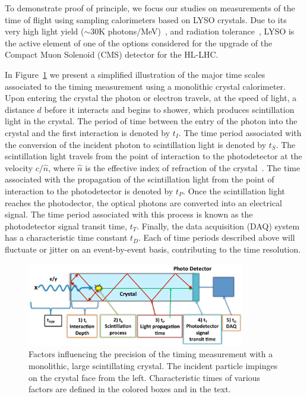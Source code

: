 \documentclass[12pt]{article}
\begin{document}
To demonstrate proof of principle, we focus our studies on
measurements of the time of flight using sampling calorimeters
based on LYSO crystals. Due to its very high light
yield ($\sim 30$K photons/MeV)~\cite{LYSOProperties},  and 
radiation tolerance~\cite{5402126, 4291695, 5402125, Dissertori:2013rma},
LYSO is the active element of one of the options considered 
for the upgrade of the Compact Muon Solenoid (CMS) detector
for the HL-LHC. 

In Figure~\ref{fig:ScintillatorTiming} we present a simplified illustration 
of the major time scales associated to the timing measurement using a 
monolithic crystal calorimeter.  Upon entering the crystal the photon or electron travels, 
at the speed of light, a distance $d$ before it interacts and begins to shower, 
which produces scintillation light in the crystal. The period of time between the 
entry of the photon into the crystal and the first interaction is denoted by $t_I$. 
The time period associated with the conversion of the incident photon to 
scintillation light is denoted by $t_S$. The scintillation light travels from 
the point of interaction to the photodetector at the velocity $c/\hat{n}$, where $\hat{n}$ 
is the effective index of refraction of the crystal~\cite{Moses}. The time associated 
with the propagation of the scintillation light from the point of interaction 
to the photodetector is denoted by $t_P$. Once the scintillation light reaches the 
photodector, the optical photons are converted into an electrical signal. The time period 
associated with this process is known as the photodetector signal transit time, $t_T$.  
Finally, the data acquisition (DAQ) system has a characteristic time constant $t_D$. 
Each of time periods described above will fluctuate or jitter on an event-by-event basis, 
contributing to the time resolution.


\begin{figure}[h] \centering
\includegraphics[width=0.85\textwidth]{figs/ScintillatorTiming_v2} \caption{Factors
influencing the precision of the timing measurement with a monolithic, large
scintillating crystal. The incident particle impinges on the crystal face from
the left. Characteristic times of various factors are defined in the colored
boxes and in the text.}
\label{fig:ScintillatorTiming}
\end{figure}
\end{document}
